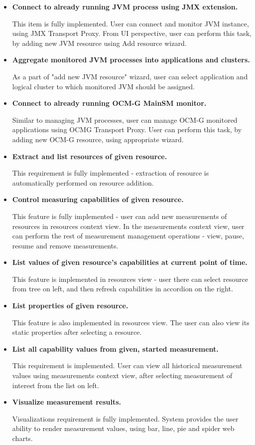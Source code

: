 \begin{itemize}

\item {\bf Connect to already running JVM process using JMX extension.}

This item is fully implemented. User can connect and monitor JVM instance, using JMX Transport Proxy. From UI perspective, user can perform this task, by adding new JVM resource using Add resource wizard.

\item {\bf Aggregate monitored JVM processes into applications and clusters.}

As a part of "add new JVM resource" wizard, user can select application and logical cluster to which monitored JVM should be assigned.

\item {\bf Connect to already running OCM-G MainSM monitor.}

Similar to managing JVM processes, user can manage OCM-G monitored applications using OCMG Transport Proxy. User can perform this task, by adding new OCM-G resource, using appropriate wizard.

\item {\bf Extract and list resources of given resource.}

This requirement is fully implemented - extraction of resource is automatically performed on resource addition.

\item {\bf Control measuring capabilities of given resource.}

This feature is fully implemented - user can add new measurements of resources in resources context view. In the measurements context view, user can perform the rest of measurement management operations - view, pause, resume and remove measurements.

\item {\bf List values of given resource\rq{}s capabilities at current point of time.}

This feature is implemented in resources view - user there can select resource from tree on left, and then refresh capabilities in accordion on the right.

\item {\bf List properties of given resource.}

This feature is also implemented in resources view. The user can also view its static properties after selecting a resource.

\item {\bf List all capability values from given, started measurement.}

This requirement is implemented. User can view all historical measurement values using measurements context view, after selecting measurement of interest from the list on left.

\item {\bf Visualize measurement results.}

Visualizations requirement is fully implemented. System provides the user ability to render measurement values, using bar, line, pie and spider web charts.

\end{itemize}

